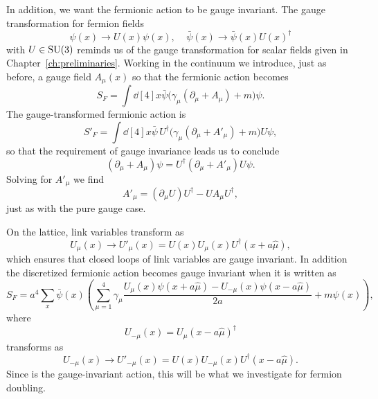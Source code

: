 In addition, we want the fermionic action to be gauge invariant. The
gauge transformation for fermion fields
\begin{equation}
  \psi(x)\to U(x)\psi(x),~~~~~\bar{\psi}(x)\to\bar{\psi}(x)U(x)^\dagger
\end{equation}
with $U\in\operatorname{SU}(3)$ reminds us of the gauge transformation for scalar 
fields given in Chapter~\ref{ch:preliminaries}. Working in the continuum 
we introduce, just as before, a gauge field $A_\mu(x)$ so that the 
fermionic action becomes
\begin{equation}
  S_F=\int\dd[4]{x}\bar{\psi}\big(\gamma_\mu(\partial_\mu+A_\mu)+m\big)\psi.
\end{equation}
The gauge-transformed fermionic action is
\begin{equation}
  S'_F=\int\dd[4]{x}\bar{\psi}\,U^\dagger
        \big(\gamma_\mu(\partial_\mu+A'_\mu)+m\big)U\psi,
\end{equation}
so that the requirement of gauge invariance leads us to conclude
\begin{equation}
  (\partial_\mu+A_\mu)\psi=U^\dagger(\partial_\mu+A'_\mu)U\psi.
\end{equation}
Solving for $A'_\mu$ we find
\begin{equation}
  A'_\mu=(\partial_\mu U)U^\dagger-UA_\mu U^\dagger,
\end{equation}
just as with the pure gauge case. 

On the lattice, link variables transform as
\begin{equation}
  U_\mu(x)\to U'_\mu(x)=U(x)U_\mu(x)U^\dagger(x+a\hat{\mu}),
\end{equation}
which ensures that closed loops of link variables are gauge invariant.
In addition the discretized fermionic action becomes gauge invariant
when it is written as
\begin{equation}\label{eq:naivefermactgauge}
  S_F=a^4\sum_x\bar{\psi}(x)\left(\sum_{\mu=1}^4\gamma_\mu
       \frac{U_\mu(x)\psi(x+a\hat{\mu})-U_{-\mu}(x)\psi(x-a\hat{\mu})}{2a}
       +m\psi(x)\right),
\end{equation}
where
\begin{equation}
  U_{-\mu}(x)=U_\mu(x-a\hat{\mu})^\dagger
\end{equation}
transforms as
\begin{equation}
  U_{-\mu}(x)\to U'_{-\mu}(x)=U(x)U_{-\mu}(x)U^\dagger(x-a\hat{\mu}).
\end{equation}
Since  is the gauge-invariant action,
this will be what we investigate for fermion doubling.

